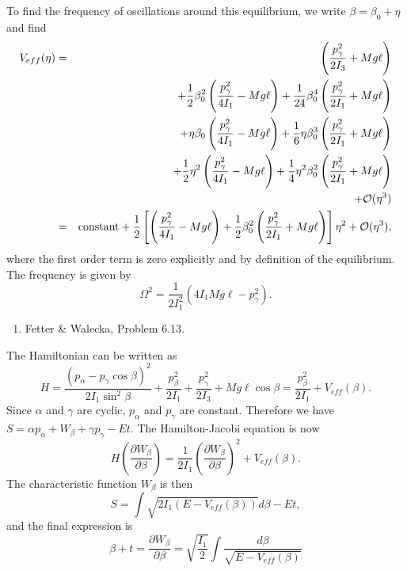 \documentclass[letterpaper,11pt]{article}
\begin{document}
To find the frequency of oscillations around this equilibrium, we write $\beta = \beta_0 + \eta$ and find
\begin{eqnarray*}
 V_{eff}(\eta) & = & \left(\frac{p^2_\gamma}{2 I_3} + Mg\ell\right) \\
 & & + \frac{1}{2}\beta_0^2 \left(\frac{p^2_\gamma}{4 I_1} - Mg\ell\right) + \frac{1}{24} \beta_0^4 \left(\frac{p^2_\gamma}{2 I_1} + Mg\ell\right) \\
 & & + \eta \beta_0 \left(\frac{p^2_\gamma}{4 I_1} - Mg\ell\right) + \frac{1}{6} \eta \beta_0^3 \left(\frac{p^2_\gamma}{2 I_1} + Mg\ell\right) \\
 & & + \frac{1}{2} \eta^2 \left(\frac{p^2_\gamma}{4 I_1} - Mg\ell\right) + \frac{1}{4} \eta^2 \beta_0^2 \left(\frac{p^2_\gamma}{2 I_1} + Mg\ell\right) \\
 & & + \mathcal{O}(\eta^3) \\
 & = & \hbox{constant} + \frac{1}{2} \left[ \left(\frac{p^2_\gamma}{4 I_1} - Mg\ell\right) + \frac{1}{2} \beta_0^2 \left(\frac{p^2_\gamma}{2 I_1} + Mg\ell\right) \right] \eta^2 + \mathcal{O}(\eta^3),
\end{eqnarray*}
where the first order term is zero explicitly and by definition of the equilibrium.  The frequency is given by
\begin{equation*}
 \Omega^2 = \frac{1}{2 I_1^2} \left( 4 I_1 Mg\ell - p_\gamma^2 \right).
\end{equation*}

\begin{enumerate}[resume]
 \item Fetter \& Walecka, Problem 6.13.
\end{enumerate}
The Hamiltonian can be written as
\begin{equation*}
 H = \frac{(p_\alpha - p_\gamma\cos\beta)^2}{2 I_1 \sin^2\beta} + \frac{p_\beta^2}{2 I_1} + \frac{p_\gamma^2}{2 I_3} + Mg\ell\cos\beta = \frac{p_\beta^2}{2 I_1} + V_{eff}(\beta).
\end{equation*}
Since $\alpha$ and $\gamma$ are cyclic, $p_\alpha$ and $p_\gamma$ are constant.  Therefore we have $S = \alpha p_\alpha + W_\beta + \gamma p_\gamma - E t$.  The Hamilton-Jacobi equation is now
\begin{equation*}
 H\left(\frac{\partial W_\beta}{\partial \beta}\right) = \frac{1}{2 I_1} \left(\frac{\partial W_\beta}{\partial \beta}\right)^2 + V_{eff}(\beta).
\end{equation*}
The characteristic function $W_\beta$ is then
\begin{equation*}
 S = \int \sqrt{2 I_1 \left(E - V_{eff}(\beta)\right)} d\beta - E t,
\end{equation*}
and the final expression is
\begin{equation*}
 \beta + t = \frac{\partial W_\beta}{\partial \beta} = \sqrt{\frac{I_1}{2}} \int \frac{d\beta}{\sqrt{E - V_{eff}(\beta)}}
\end{equation*}
\end{document}
